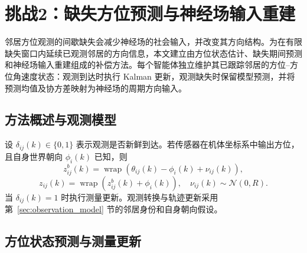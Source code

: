 \documentclass[UTF8,fontset=windows,11pt]{ctexart}
\begin{document}
\section{挑战2：缺失方位预测与神经场输入重建}\label{sec:prediction_method}

邻居方位观测的间歇缺失会减少神经场的社会输入，并改变其方向结构。为在有限缺失窗口内延续已观测邻居的方向信息，本文建立由方位状态估计、缺失期间预测和神经场输入重建组成的补偿方法。每个智能体独立维护其已跟踪邻居的方位--方位角速度状态：观测到达时执行 Kalman 更新，观测缺失时保留模型预测，并将预测均值及协方差映射为神经场的周期方向输入。

\subsection{方法概述与观测模型}
设 $\delta_{ij}(k)\in\{0,1\}$ 表示观测是否新鲜到达。若传感器在机体坐标系中输出方位，且自身世界朝向 $\phi_i(k)$ 已知，则
\begin{equation}
 z^b_{ij}(k)=\operatorname{wrap}(\theta_{ij}(k)-\phi_i(k)+\nu_{ij}(k)),
\end{equation}
\begin{equation}
 z_{ij}(k)=\operatorname{wrap}(z^b_{ij}(k)+\phi_i(k)),
 \quad \nu_{ij}(k)\sim\mathcal N(0,R).
\end{equation}
当 $\delta_{ij}(k)=1$ 时执行测量更新。观测转换与轨迹更新采用第~\ref{sec:observation_model} 节的邻居身份和自身朝向假设。

\subsection{方位状态预测与测量更新}
\end{document}
